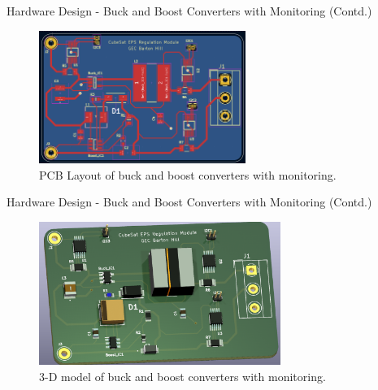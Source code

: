 \documentclass[aspectratio=169]{beamer}
\begin{document}
\begin{frame}{Hardware Design - Buck and Boost Converters with Monitoring (Contd.) }
		\begin{figure}[h]
			\centering
			\includegraphics[width=0.6\textwidth]{diag/1 pcb.png}
			\caption{PCB Layout of buck and boost converters with monitoring.}
			\label{fig:bubo}
		\end{figure}
	\end{frame}
	\begin{frame}{Hardware Design - Buck and Boost Converters with Monitoring (Contd.) }
		\begin{figure}[h]
			\centering
			\includegraphics[width=0.7\textwidth]{diag/1 3d.png}
			\caption{3-D model of buck and boost converters with monitoring.}
			\label{fig:bubo}
		\end{figure}
	\end{frame}
\end{document}
